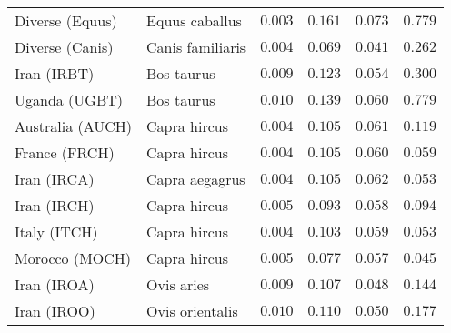 \documentclass{article}
\begin{document}
\begin{center}
\begin{longtable}{|l|l|r|r|r|r|}
            \bottomrule
            \endlastfoot
            Diverse (Equus)                & Equus caballus      & $ 0.003$              & $ 0.161$                & $ 0.073$                 & $ 0.779$                     \\
            Diverse (Canis)                & Canis familiaris    & $ 0.004$              & $ 0.069$                & $ 0.041$                 & $ 0.262$                     \\
            Iran (IRBT)                    & Bos taurus          & $ 0.009$              & $ 0.123$                & $ 0.054$                 & $ 0.300$                     \\
            Uganda (UGBT)                  & Bos taurus          & $ 0.010$              & $ 0.139$                & $ 0.060$                 & $ 0.779$                     \\
            Australia (AUCH)               & Capra hircus        & $ 0.004$              & $ 0.105$                & $ 0.061$                 & $ 0.119$                     \\
            France (FRCH)                  & Capra hircus        & $ 0.004$              & $ 0.105$                & $ 0.060$                 & $ 0.059$                     \\
            Iran (IRCA)                    & Capra aegagrus      & $ 0.004$              & $ 0.105$                & $ 0.062$                 & $ 0.053$                     \\
            Iran (IRCH)                    & Capra hircus        & $ 0.005$              & $ 0.093$                & $ 0.058$                 & $ 0.094$                     \\
            Italy (ITCH)                   & Capra hircus        & $ 0.004$              & $ 0.103$                & $ 0.059$                 & $ 0.053$                     \\
            Morocco (MOCH)                 & Capra hircus        & $ 0.005$              & $ 0.077$                & $ 0.057$                 & $ 0.045$                     \\
            Iran (IROA)                    & Ovis aries          & $ 0.009$              & $ 0.107$                & $ 0.048$                 & $ 0.144$                     \\
            Iran (IROO)                    & Ovis orientalis     & $ 0.010$              & $ 0.110$                & $ 0.050$                 & $ 0.177$                     \\

\end{longtable}
\end{center}
\end{document}
